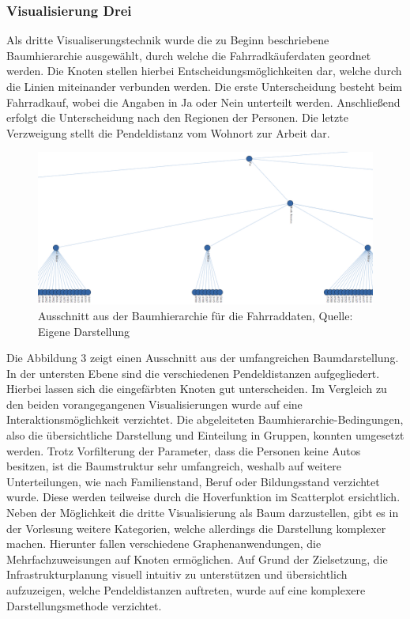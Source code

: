 \documentclass[usegeometry=true]{scrartcl}
\begin{document}
\subsubsection{Visualisierung Drei}
Als dritte Visualiserungstechnik wurde die zu Beginn beschriebene Baumhierarchie ausgewählt, durch welche die Fahrradkäuferdaten geordnet werden. Die Knoten stellen hierbei Entscheidungsmöglichkeiten dar, welche durch die Linien miteinander verbunden werden. Die erste Unterscheidung besteht beim Fahrradkauf, wobei die Angaben in Ja oder Nein unterteilt werden. Anschließend erfolgt die Unterscheidung nach den Regionen der Personen. Die letzte Verzweigung stellt die Pendeldistanz vom Wohnort zur Arbeit dar. 
\begin{figure}[h]
\begin{center}
\includegraphics[width=16cm]{Bilder/V3Baumhierarchie.png}
\caption{Ausschnitt aus der Baumhierarchie für die Fahrraddaten, Quelle: Eigene Darstellung}
\end{center}
\end{figure}
\newline
Die Abbildung 3 zeigt einen Ausschnitt aus der umfangreichen Baumdarstellung. In der untersten Ebene sind die verschiedenen Pendeldistanzen aufgegliedert. Hierbei lassen sich die eingefärbten Knoten gut unterscheiden. Im Vergleich zu den beiden vorangegangenen Visualisierungen wurde auf eine Interaktionsmöglichkeit verzichtet. Die abgeleiteten Baumhierarchie-Bedingungen, also die übersichtliche Darstellung und Einteilung in Gruppen, konnten umgesetzt werden. Trotz Vorfilterung der Parameter, dass die Personen keine Autos besitzen, ist die Baumstruktur sehr umfangreich, weshalb auf weitere Unterteilungen, wie nach Familienstand, Beruf oder Bildungsstand verzichtet wurde. Diese werden teilweise durch die Hoverfunktion im Scatterplot ersichtlich. Neben der Möglichkeit die dritte Visualisierung als Baum darzustellen, gibt es in der Vorlesung weitere Kategorien, welche allerdings die Darstellung komplexer machen. Hierunter fallen verschiedene Graphenanwendungen, die Mehrfachzuweisungen auf Knoten ermöglichen. Auf Grund der Zielsetzung, die Infrastrukturplanung visuell intuitiv zu unterstützen und übersichtlich aufzuzeigen, welche Pendeldistanzen auftreten, wurde auf eine komplexere Darstellungsmethode verzichtet. 
\end{document}
